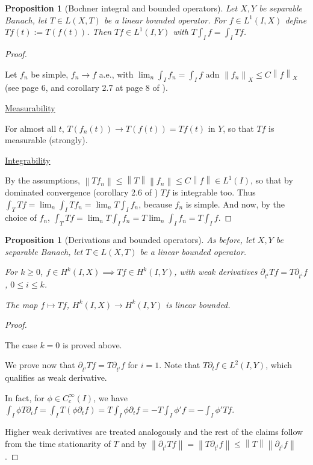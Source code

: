 \documentclass[english,a4paper,12pt,oneside]{scrbook}
\theoremstyle{break}
\newtheorem{prop}[equation]{Proposition}
\newenvironment{mproof}[1][\proofname]{%
  \begin{proof}[#1]$ $\par\nobreak\ignorespaces
}{%
  \end{proof}
}
\renewcommand*{\proofname}{Proof}
\theoremstyle{remark}
\newcommand{\norm}[1]{\left\lVert#1\right\rVert}
\begin{document}
\begin{prop}[Bochner integral and bounded operators]
\label{prop:bochner_bound}
Let $X,Y$ be separable Banach, let $T \in L(X,T)$ be a linear bounded operator. For $f \in L^1(I,X)$ define $Tf (t):= T(f(t))$. Then $Tf \in L^1(I,Y)$ with $T\int_I f = \int_I Tf$.
\end{prop}
\begin{mproof}
Let $f_n$ be simple, $f_n\rightarrow f $ a.e., with $\lim_n \int_I f_n = \int_I f$ adn $\norm{f_n}_X \leq C \norm{f}_X$ (see page 6, and corollary 2.7 at page 8 of \cite{kreuter}).

\underline{Measurability}

For almost all $t$, $T(f_n(t)) \rightarrow T(f(t))=Tf(t)$ in $Y$, so that $Tf$ is measurable (strongly).

\underline{Integrability}

By the assumptions, $\norm{Tf_n}\leq \norm{T}\norm{f_n}\leq C\norm{f}\in L^1(I)$, so that by dominated convergence (corollary 2.6 of \cite{kreuter}) $Tf$ is integrable too. Thus $\int_T Tf = \lim_n \int_I  Tf_n = \lim_n T\int_I  f_n$, because $f_n$ is simple. And now, by the choice of $f_n$, $\int_T Tf = \lim_n T\int_I  f_n = T \lim_n \int_I  f_n = T \int_I f$.

\end{mproof}

\begin{prop}	[Derivations and bounded operators]
\label{lemma:bochner_Hk_map}
As before, let $X,Y$ be separable Banach, let $T \in L(X,T)$ be a linear bounded operator.

For $k\geq 0$, $f \in H^k(I,X)\implies Tf \in H^k(I,Y)$, with weak derivatives $\partial_{t^i}Tf = T\partial_{t^i}f$, $0\leq i \leq k$.

The map $f \mapsto Tf$, $H^k(I,X)\rightarrow H^k(I,Y)$ is linear bounded.
\end{prop}
\begin{mproof}
The case $k=0$ is proved above.

We prove now that $\partial_{t^i}Tf = T\partial_{t^i}f$ for $i=1$. Note that $T\partial_t f \in L^2(I,Y)$, which qualifies as weak derivative.

In fact, for $\phi \in C_c^\infty(I)$, we have $\int_I \phi T\partial_i f = \int_I T(\phi\partial_t f) = T \int_I\phi\partial_t f = -T\int_I\phi'f=-\int_I\phi'Tf$.

Higher weak derivatives are treated analogously and the rest of the claims follow from the time stationarity of $T$ and by $\norm{\partial_{t^i}Tf}=\norm{T\partial_{t^i}f}\leq \norm{T}\norm{\partial_{t^i}f}$.

\end{mproof}
\end{document}
